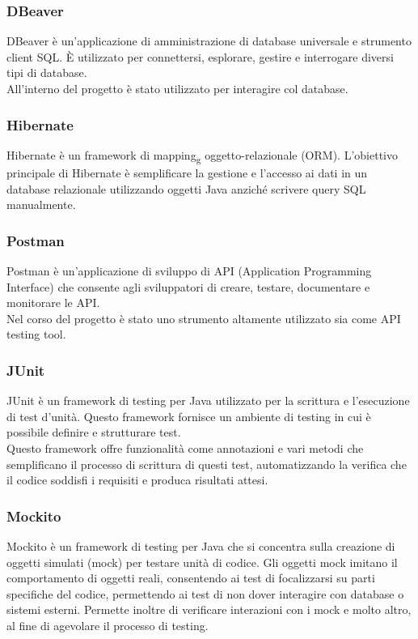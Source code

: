 \subsubsection*{DBeaver}
DBeaver è un'applicazione di amministrazione di database universale e strumento client SQL. È utilizzato per connettersi, esplorare, gestire e interrogare diversi tipi di database.\\
All'interno del progetto è stato utilizzato per interagire col database.
\\


\subsubsection*{Hibernate}
Hibernate è un framework di mapping\textsubscript{g} oggetto-relazionale (ORM). L'obiettivo principale di Hibernate è semplificare la gestione e l'accesso ai dati in un database relazionale utilizzando oggetti Java anziché scrivere query SQL manualmente.
\\


\subsubsection*{Postman}
Postman è un'applicazione di sviluppo di API (Application Programming Interface) che consente agli sviluppatori di creare, testare, documentare e monitorare le API.\\
Nel corso del progetto è stato uno strumento altamente utilizzato sia come API testing tool.\\

\subsubsection*{JUnit} 
JUnit è un framework di testing per Java utilizzato per la scrittura e l’esecuzione di test d’unità. Questo framework fornisce un ambiente di testing in cui è possibile definire e strutturare test.\\ Questo framework offre funzionalità come annotazioni e vari metodi che semplificano il processo di scrittura di questi test, automatizzando la verifica che il codice soddisfi i requisiti e produca risultati attesi.\\

\subsubsection*{Mockito}
Mockito è un framework di testing per Java che si concentra sulla creazione di oggetti simulati (mock) per testare unità di codice. Gli oggetti mock imitano il comportamento di oggetti reali, consentendo ai test di focalizzarsi su parti specifiche del codice, permettendo ai test di non dover interagire con database o sistemi esterni. Permette inoltre di verificare interazioni con i mock e molto altro, al fine di agevolare il processo di testing.\\


